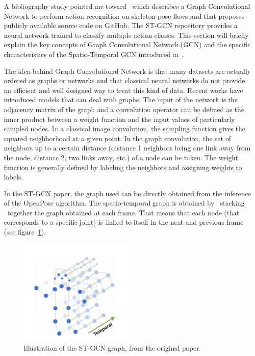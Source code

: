 \documentclass[12pt,a4paper,twoside]{article}
\begin{document}
A bibliography study pointed me toward~\cite{Yan2018} which describes a Graph Convolutional Network to perform action recognition on skeleton pose flows and that proposes publicly available source code on GitHub. The ST-GCN repository provides a neural network trained to classify multiple action classes. This section will briefly explain the key concepts of Graph Convolutional Network (GCN) and the specific characteristics of the Spatio-Temporal GCN introduced in~\cite{Yan2018}.

The idea behind Graph Convolutional Network is that many datasets are actually ordered as graphs or networks and that classical neural networks do not provide an efficient and well designed way to treat this kind of data. Recent works have introduced models that can deal with graphs. The input of the network is the adjacency matrix of the graph and a convolution operator can be defined as the inner product between a weight function and the input values of particularly sampled nodes. In a classical image convolution, the sampling function gives the squared neighborhood at a given point. In the graph convolution, the set of neighbors up to a certain distance (distance 1 neighbors being one link away from the node, distance 2, two links away, etc.) of a node can be taken. The weight function is generally defined by labeling the neighbors and assigning weights to labels.
 
In the ST-GCN paper, the graph used can be directly obtained from the inference of the OpenPose algorithm. The spatio-temporal graph is obtained by \guillemotleft~stacking \guillemotright~together the graph obtained at each frame. That means that each node (that corresponds to a specific joint) is linked to itself in the next and previous frame (see figure~\ref{fig:stgcn_graph}).

\begin{figure}
    \centering
        \includegraphics[width=0.5\textwidth]{images/stgcn_graph}
    \caption{Illustration of the ST-GCN graph, from the original paper.}
\label{fig:stgcn_graph}
\end{figure}
\end{document}
